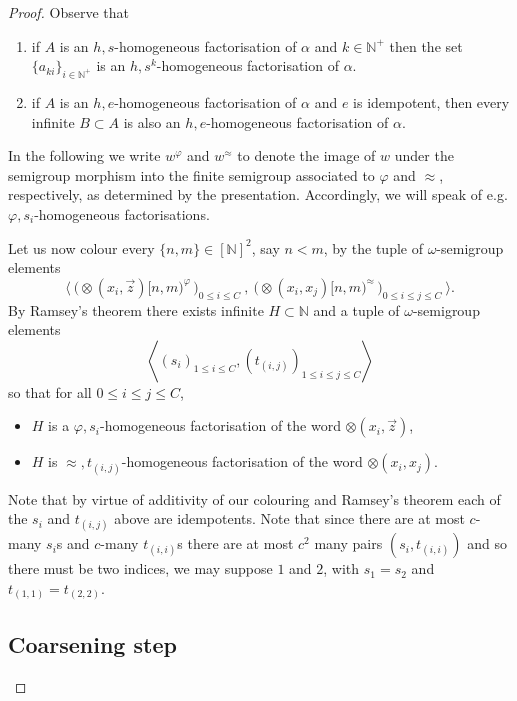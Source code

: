 \documentclass{stacs_proc}
\newcommand{\Nat}{\mathbb{N}}
\begin{document}
\begin{proof}
\noindent Observe that
\begin{enumerate}
\item if $A$ is an $h,s$-homogeneous factorisation of $\alpha$ and $k \in \Nat^+$ 
      then the set $\{a_{ki}\}_{i \in \Nat^+}$ is an $h,{s^k}$-homogeneous factorisation 
      of $\alpha$.
\item if $A$ is an $h,e$-homogeneous factorisation of $\alpha$ and $e$ is idempotent, 
      then every infinite $B \subset A$ is also an $h,e$-homogeneous factorisation 
      of $\alpha$.
\end{enumerate}

\noindent 
In the following we write $w^\varphi$ and $w^\approx$ to denote the image 
of $w$ under the semigroup morphism into the finite semigroup associated 
to $\varphi$ and $\approx$, respectively, as determined by the presentation. 
Accordingly, we will speak of e.g. $\varphi,s_i$-homogeneous factorisations.


Let us now colour every $\{n,m\} \in [\Nat]^2$, say $n < m$, by the tuple 
of $\omega$-semigroup elements
\[
\langle \
\big( \otimes(x_i,\vec{z})[n,m)^\varphi \, \big)_{0 \leq i \leq C}\ , \
\big( \otimes(x_i,x_j)[n,m)^\approx \, \big)_{0 \leq i \leq j \leq C} \
\rangle.
\]
By Ramsey's theorem there exists infinite $H \subset \Nat$ and a tuple of
$\omega$-semigroup elements 
\[
\left<
(s_i)_{1 \leq i \leq C}, 
(t_{(i,j)})_{1 \leq i \leq j \leq C}
\right>
\]
so that for all $0 \leq i \leq j \leq C$,
\begin{itemize}
\item $H$ is a $\varphi,s_i$-homogeneous factorisation of the word $\otimes(x_i,\vec{z})$, 
\item $H$ is $\approx,t_{(i,j)}$-homogeneous factorisation of the word $\otimes(x_i,x_j)$. 
\end{itemize}

Note that by virtue of additivity of our colouring and Ramsey's theorem 
each of the $s_i$ and $t_{(i,j)}$ above are idempotents.
Note that since there are at most $c$-many $s_i$s and $c$-many $t_{(i,i)}$s
there are at most $c^2$ many pairs $(s_i,t_{(i,i)})$ and so there must be two
indices, we may suppose $1$ and $2$, with $s_1 = s_2$ and $t_{(1,1)} =
t_{(2,2)}$. 



\vskip-0.3cm
\subsection{Coarsening step}


\end{proof}
\end{document}
